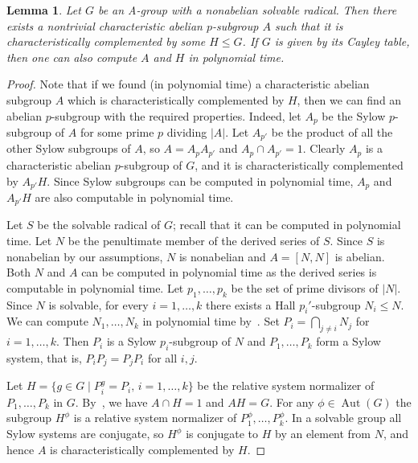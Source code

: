 \documentclass{article}
\newtheorem{lemma}[theorem]{Lemma}
\DeclareMathOperator{\Aut}{Aut}
\begin{document}
\begin{lemma}\label{sgen}
	Let \( G \) be an A-group with a nonabelian solvable radical.
	Then there exists a nontrivial characteristic abelian \( p \)-subgroup \( A \)
	such that it is characteristically complemented by some \( H \leq G \).
	If \( G \) is given by its Cayley table, then one can also compute \( A \) and \( H \) in polynomial time.
\end{lemma}
\begin{proof}
	Note that if we found (in polynomial time) a characteristic abelian subgroup \( A \) which is characteristically complemented by \( H \),
	then we can find an abelian \( p \)-subgroup with the required properties.
	Indeed, let \( A_p \) be the Sylow \( p \)-subgroup of \( A \) for some prime \( p \) dividing \( |A| \).
	Let \( A_{p'} \) be the product of all the other Sylow subgroups of \( A \), so \( A = A_p A_{p'} \) and \( A_p \cap A_{p'} = 1 \).
	Clearly \( A_p \) is a characteristic abelian \( p \)-subgroup of \( G \), and it is characteristically complemented by \( A_{p'}H \).
	Since Sylow subgroups can be computed in polynomial time, \( A_p \) and \( A_{p'}H \) are also computable in polynomial time.

	Let \( S \) be the solvable radical of \( G \); recall that it can be computed in polynomial time.
	Let \( N \) be the penultimate member of the derived series of \( S \).
	Since \( S \) is nonabelian by our assumptions, \( N \) is nonabelian and \( A = [N, N] \) is abelian.
	Both \( N \) and \( A \) can be computed in polynomial time as the derived series is computable in polynomial time.
	Let \( p_1, \dots, p_k \) be the set of prime divisors of \( |N| \). Since \( N \) is solvable,
	for every \( i = 1, \dots, k \) there exists a Hall \( p_i' \)-subgroup \( N_i \leq N \).
	We can compute \( N_1, \dots, N_k \) in polynomial time by~\cite[Theorem~5.3]{kantor}.
	Set \( P_i = \bigcap_{j \neq i} N_j \) for \( i = 1, \dots, k \). Then \( P_i \) is a Sylow \( p_i \)-subgroup of \( N \)
	and \( P_1, \dots, P_k \) form a Sylow system, that is, \( P_iP_j = P_jP_i \) for all \( i, j \).

	Let \( H = \{ g \in G \mid P_i^g = P_i,\, i = 1, \dots, k \} \) be the relative system normalizer of \( P_1, \dots, P_k \) in \( G \).
	By~\cite[Corollary~4.6]{broshi}, we have \( A \cap H = 1 \) and \( AH = G \). For any \( \phi \in \Aut(G) \) the subgroup \( H^\phi \)
	is a relative system normalizer of \( P_1^\phi, \dots, P_k^\phi \). In a solvable group all Sylow systems are conjugate, so
	\( H^\phi \) is conjugate to \( H \) by an element from \( N \), and hence \( A \) is characteristically complemented by \( H \).
\end{proof}
\end{document}

